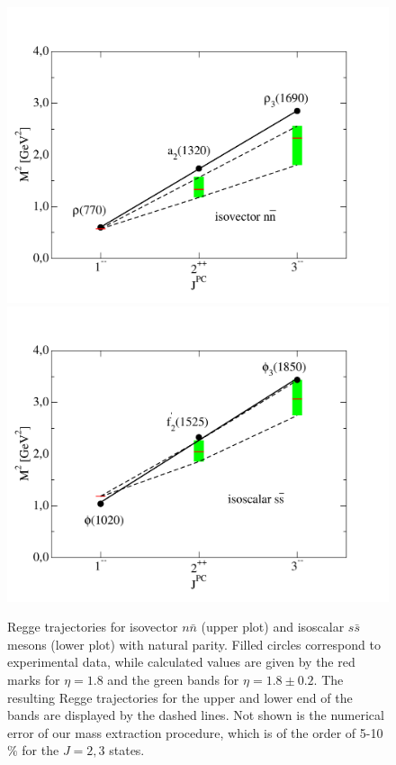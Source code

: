 \begin{figure}[!t]
\begin{center}
\includegraphics[width=0.999\columnwidth]{figures/reggenn_v2}\\
\includegraphics[width=0.999\columnwidth]{figures/reggess_v2}
\caption{Regge trajectories for isovector $n\bar{n}$ (upper plot)
and isoscalar $s\bar{s}$ mesons (lower plot) with natural parity. 
Filled circles correspond to experimental data, while calculated values are given by the red marks
for $\eta = 1.8$ and the green bands for $\eta = 1.8 \pm 0.2$. The resulting Regge trajectories for 
the upper and lower end of the bands are displayed by the dashed lines. Not shown is the numerical
error of our mass extraction procedure, which is of the order of 5-10 $\%$ for the $J=2,3$ states.}\label{fig:regge}
\end{center}
\end{figure}

